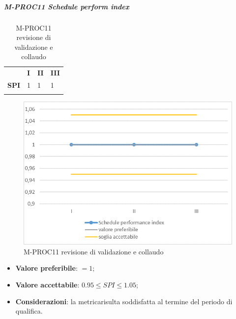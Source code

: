 \subparagraph{M-PROC11 Schedule perform index} \mbox{}
\begin{longtable}[H!] {						
		>{}p{50mm}  		
		>{}p{8mm}
		>{}p{8mm}		
		>{}p{8mm}		
	}
	\rowcolor{gray!50}
	\textbf{} & \textbf{I} & \textbf{II} & \textbf{III} \TBstrut \\ [2mm]
	\textbf{SPI} & 1 & 1 & 1 \TBstrut \\ [2mm]
	\rowcolor{white}
	\caption{M-PROC11 revisione di validazione e collaudo}
\end{longtable}
\begin{figure}[H] 	
	\includegraphics[width=\linewidth]{./img/grafici/RA11.png}	
	\caption{M-PROC11 revisione di validazione e collaudo}	
\end{figure}
\begin{itemize}
	\item \textbf{Valore preferibile}: $=1$;
	\item \textbf{Valore accettabile}: $0.95 \le SPI \le 1.05$;
	\item \textbf{Considerazioni}: la metrica\glosp risulta soddisfatta al termine del periodo di qualifica.
\end{itemize}


